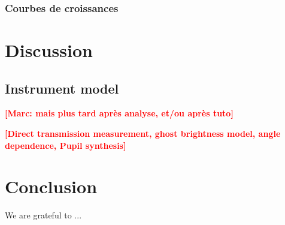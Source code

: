 \documentclass[onecolumn]{aa}
\newcommand{\todo}[1]{\textbf{\textcolor{red}{[#1]}}\xspace}
\begin{document}
\subsubsection{Courbes de croissances}


\section{Discussion}

\subsection{Instrument model}\label{sec:model}

\todo{Marc: mais plus tard après analyse, et/ou après tuto}

\todo{Direct transmission measurement, ghost brightness model, angle dependence,  Pupil synthesis}

\section{Conclusion}
\label{sec:conclusion}

\begin{acknowledgements}
We are grateful to ...
\end{acknowledgements}




\appendix
\end{document}
